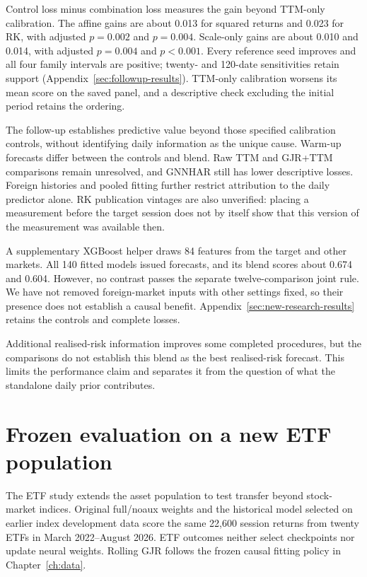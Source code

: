 

Control loss minus combination loss measures the gain beyond TTM-only calibration. The affine gains are about 0.013 for squared returns and 0.023 for RK, with adjusted $p=0.002$ and $p=0.004$. Scale-only gains are about 0.010 and 0.014, with adjusted $p=0.004$ and $p<0.001$. Every reference seed improves and all four family intervals are positive; twenty- and 120-date sensitivities retain support (Appendix~\ref{sec:followup-results}). TTM-only calibration worsens its mean score on the saved panel, and a descriptive check excluding the initial period retains the ordering.

The follow-up establishes predictive value beyond those specified calibration controls, without identifying daily information as the unique cause. Warm-up forecasts differ between the controls and blend. Raw TTM and GJR+TTM comparisons remain unresolved, and GNNHAR still has lower descriptive losses. Foreign histories and pooled fitting further restrict attribution to the daily predictor alone. RK publication vintages are also unverified: placing a measurement before the target session does not by itself show that this version of the measurement was available then.

A supplementary XGBoost helper draws 84 features from the target and other markets. All 140 fitted models issued forecasts, and its blend scores about 0.674 and 0.604. However, no contrast passes the separate twelve-comparison joint rule. We have not removed foreign-market inputs with other settings fixed, so their presence does not establish a causal benefit. Appendix~\ref{sec:new-research-results} retains the controls and complete losses.

Additional realised-risk information improves some completed procedures, but the comparisons do not establish this blend as the best realised-risk forecast. This limits the performance claim and separates it from the question of what the standalone daily prior contributes.
\FloatBarrier

\section{Frozen evaluation on a new ETF population}
\label{sec:external-etfs}

The ETF study extends the asset population to test transfer beyond stock-market indices. Original full/noaux weights and the historical model selected on earlier index development data score the same 22,600 session returns from twenty ETFs in March 2022--August 2026. ETF outcomes neither select checkpoints nor update neural weights. Rolling GJR follows the frozen causal fitting policy in Chapter~\ref{ch:data}.

